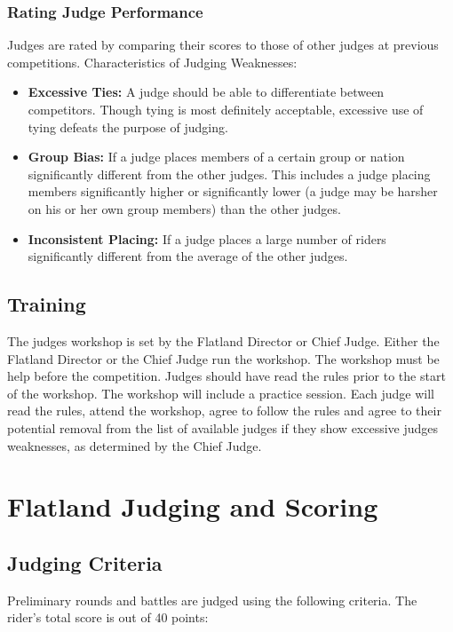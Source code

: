 \subsubsection{Rating Judge Performance}
Judges are rated by comparing their scores to those of other judges at previous competitions.
Characteristics of Judging Weaknesses:
\begin{itemize}
\item \textbf{Excessive Ties:}
A judge should be able to differentiate between competitors.
Though tying is most definitely acceptable, excessive use of tying defeats the purpose of judging.
\item \textbf{Group Bias:}
If a judge places members of a certain group or nation significantly different from the other judges.
This includes a judge placing members significantly higher or significantly lower (a judge may be harsher on his or her own group members) than the other judges.
\item\textbf{Inconsistent Placing:}
If a judge places a large number of riders significantly different from the average of the other judges.
\end{itemize}

\subsection{Training}
The judges workshop is set by the Flatland Director or Chief Judge.
Either the Flatland Director or the Chief Judge run the workshop.
The workshop must be help before the competition.
Judges should have read the rules prior to the start of the workshop.
The workshop will include a practice session.
Each judge will read the rules, attend the workshop,  agree to follow the rules and agree to their potential removal from the list of available judges if they show excessive judges weaknesses, as determined by the Chief Judge.

\section{Flatland Judging and Scoring \label{sec:flat\itemstreet_flatland\itemjudging\itemscoring}}

\subsection{Judging Criteria}

Preliminary rounds and battles are judged using the following criteria.
The rider's total score is out of 40 points:

